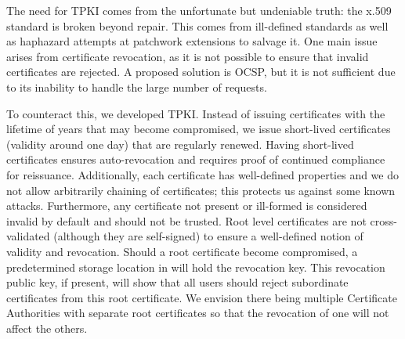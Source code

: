 The need for TPKI comes from the unfortunate but undeniable truth:
the x.509 standard is broken beyond repair.
This comes from ill-defined standards as well as haphazard attempts
at patchwork extensions to salvage it.
One main issue arises from certificate revocation, as it is not
possible to ensure that invalid certificates are rejected.
A proposed solution is OCSP, but it is not sufficient due to its
inability to handle the large number of requests.

To counteract this, we developed TPKI.
Instead of issuing certificates with the lifetime of years that
may become compromised, we issue short-lived certificates (validity
around one day) that are regularly renewed.
Having short-lived certificates ensures auto-revocation and requires
proof of continued compliance for reissuance.
Additionally, each certificate has well-defined properties and we
do not allow arbitrarily chaining of certificates; this protects
us against some known attacks.
Furthermore, any certificate not present or ill-formed is considered
invalid by default and should not be trusted.
Root level certificates are not cross-validated (although they
are self-signed) to ensure a well-defined notion of validity
and revocation.
Should a root certificate become compromised, a predetermined storage
location in \LayerTwo{} will hold the revocation key.
This revocation public key, if present, will show that all users
should reject subordinate certificates from this root certificate.
We envision there being multiple Certificate Authorities with separate
root certificates so that the revocation of one will not affect
the others.

